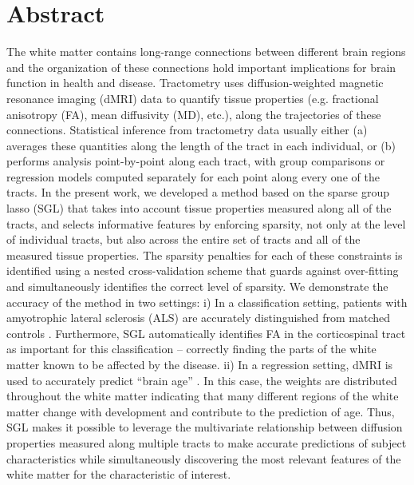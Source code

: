 \section*{Abstract}

The white matter contains long-range connections between different
brain regions and the organization of these connections hold important
implications for brain function in health and disease. Tractometry
uses diffusion-weighted magnetic resonance imaging (dMRI) data
to quantify tissue properties (e.g. fractional anisotropy (FA),
mean diffusivity (MD), etc.), along the trajectories of these
connections\cite{yeatman2012tract}. Statistical inference from
tractometry data usually either (a) averages these quantities along
the length of the tract in each individual, or (b) performs analysis
point-by-point along each tract, with group comparisons or regression
models computed separately for each point along every one of the tracts.
In the present work, we developed a method based on the sparse group
lasso (SGL) \cite{simon2013sparse} that takes into account tissue
properties measured along all of the tracts, and selects informative
features by enforcing sparsity, not only at the level of individual
tracts, but also across the entire set of tracts and all of the measured
tissue properties. The sparsity penalties for each of these constraints
is identified using a nested cross-validation scheme that guards
against over-fitting and simultaneously identifies the correct
level of sparsity. We demonstrate the accuracy of the method in two
settings: i) In a classification setting, patients with amyotrophic
lateral sclerosis (ALS) are accurately distinguished from matched
controls \cite{sarica2017corticospinal}. Furthermore, SGL automatically
identifies FA in the corticospinal tract as important for this
classification -- correctly finding the parts of the white matter known
to be affected by the disease. ii) In a regression setting, dMRI is
used to accurately predict ``brain age'' \cite{yeatman2014lifespan,
Brown2012-so}. In this case, the weights are distributed throughout the
white matter indicating that many different regions of the white matter
change with development and contribute to the prediction of age. Thus,
SGL makes it possible to leverage the multivariate relationship between
diffusion properties measured along multiple tracts to make accurate
predictions of subject characteristics while simultaneously discovering
the most relevant features of the white matter for the characteristic of
interest.
